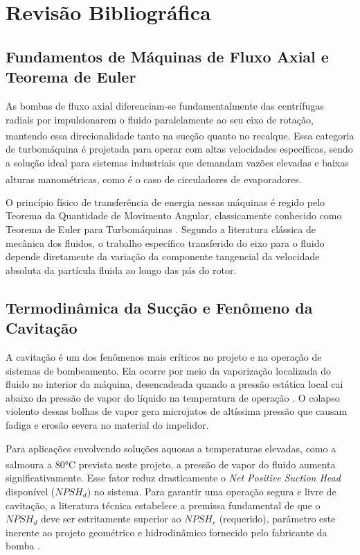 \section{Revisão Bibliográfica}
\label{sec:revisao}


\subsection{Fundamentos de Máquinas de Fluxo Axial e Teorema de Euler}
\label{subsec:fundamentos}
As bombas de fluxo axial diferenciam-se fundamentalmente das centrífugas radiais por impulsionarem o fluido paralelamente ao seu eixo de rotação, mantendo essa direcionalidade tanto na sucção quanto no recalque\textsuperscript{}\textsuperscript{}\textsuperscript{}\textsuperscript{}. Essa categoria de turbomáquina é projetada para operar com altas velocidades específicas, sendo a solução ideal para sistemas industriais que demandam vazões elevadas e baixas alturas manométricas, como é o caso de circuladores de evaporadores\textsuperscript{}\textsuperscript{}\textsuperscript{}\textsuperscript{}.


O princípio físico de transferência de energia nessas máquinas é regido pelo Teorema da Quantidade de Movimento Angular, classicamente conhecido como Teorema de Euler para Turbomáquinas \cite{fox2018, macintyre2013}. Segundo a literatura clássica de mecânica dos fluidos, o trabalho específico transferido do eixo para o fluido depende diretamente da variação da componente tangencial da velocidade absoluta da partícula fluida ao longo das pás do rotor.


\subsection{Termodinâmica da Sucção e Fenômeno da Cavitação}
\label{subsec:cavitacao}

A cavitação é um dos fenômenos mais críticos no projeto e na operação de sistemas de bombeamento. Ela ocorre por meio da vaporização localizada do fluido no interior da máquina, desencadeada quando a pressão estática local cai abaixo da pressão de vapor do líquido na temperatura de operação \cite{white2011}. O colapso violento dessas bolhas de vapor gera microjatos de altíssima pressão que causam fadiga e erosão severa no material do impelidor.

Para aplicações envolvendo soluções aquosas a temperaturas elevadas, como a salmoura a 80°C prevista neste projeto\textsuperscript{}, a pressão de vapor do fluido aumenta significativamente. Esse fator reduz drasticamente o \textit{Net Positive Suction Head} disponível ($NPSH_d$) no sistema. Para garantir uma operação segura e livre de cavitação, a literatura técnica estabelece a premissa fundamental de que o $NPSH_d$ deve ser estritamente superior ao $NPSH_r$ (requerido), parâmetro este inerente ao projeto geométrico e hidrodinâmico fornecido pelo fabricante da bomba \cite{munson2013}.


